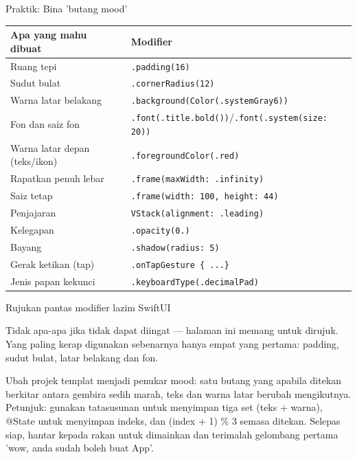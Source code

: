 \begin{tcbpractice}{Praktik: Bina 'butang mood'}

\begin{center}
\begin{tabularx}{\linewidth}{|X|X|}
\hline
\textbf{Apa yang mahu dibuat} & \textbf{Modifier} \tabularnewline
\hline
Ruang tepi & \texttt{.\allowbreak padding(16)} \tabularnewline
Sudut bulat & \texttt{.\allowbreak cornerRadius(12)} \tabularnewline
Warna latar belakang & \texttt{.\allowbreak background(Color(.\allowbreak systemGray6))} \tabularnewline
Fon dan saiz fon & \texttt{.\allowbreak font(.\allowbreak title.\allowbreak bold())}/\texttt{.\allowbreak font(.\allowbreak system(size: 20))} \tabularnewline
Warna latar depan (teks/ikon) & \texttt{.\allowbreak foregroundColor(.\allowbreak red)} \tabularnewline
Rapatkan penuh lebar & \texttt{.\allowbreak frame(maxWidth: .\allowbreak infinity)} \tabularnewline
Saiz tetap & \texttt{.\allowbreak frame(width: 100, height: 44)} \tabularnewline
Penjajaran & \texttt{VStack(alignment: .\allowbreak leading)} \tabularnewline
Kelegapan & \texttt{.\allowbreak opacity(0.\allowbreak 6)} \tabularnewline
Bayang & \texttt{.\allowbreak shadow(radius: 5)} \tabularnewline
Gerak ketikan (tap) & \texttt{.\allowbreak onTapGesture \{ .\allowbreak .\allowbreak .\allowbreak  \}} \tabularnewline
Jenis papan kekunci & \texttt{.\allowbreak keyboardType(.\allowbreak decimalPad)} \tabularnewline
\hline
\end{tabularx}
\end{center}

\begin{center}\small\color{gray}Rujukan pantas modifier lazim SwiftUI\end{center}

Tidak apa-apa jika tidak dapat diingat — halaman ini memang untuk dirujuk. Yang paling kerap digunakan sebenarnya hanya empat yang pertama: padding, sudut bulat, latar belakang dan fon.

Ubah projek templat menjadi penukar mood: satu butang yang apabila ditekan berkitar antara gembira sedih marah, teks dan warna latar berubah mengikutnya. Petunjuk: gunakan tatasusunan untuk menyimpan tiga set (teks + warna), @State untuk menyimpan indeks, dan (index + 1) \% 3 semasa ditekan. Selepas siap, hantar kepada rakan untuk dimainkan dan terimalah gelombang pertama 'wow, anda sudah boleh buat App'.

\end{tcbpractice}


